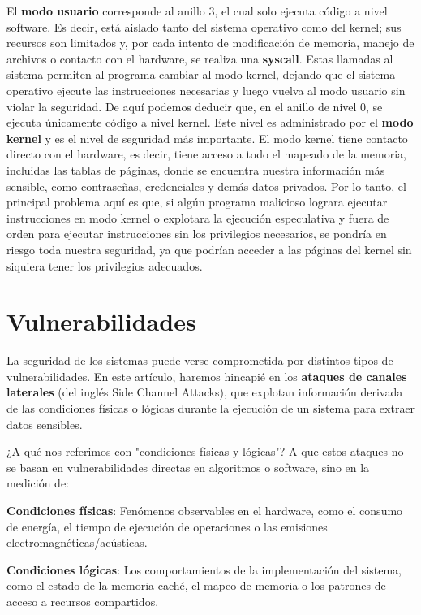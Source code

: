 \documentclass[lettersize,compsoc]{IEEEtran}
\begin{document}
El \textbf{modo usuario} corresponde al anillo 3, el cual solo ejecuta código a nivel software. Es decir, está aislado tanto del sistema operativo como del kernel; sus recursos son limitados y, por cada intento de modificación de memoria, manejo de archivos o contacto con el hardware, se realiza una \textbf{syscall}\cite{syscall}. Estas llamadas al sistema permiten al programa cambiar al modo kernel, dejando que el sistema operativo ejecute las instrucciones necesarias y luego vuelva al modo usuario sin violar la seguridad.
\newline
De aquí podemos deducir que, en el anillo de nivel 0, se ejecuta únicamente código a nivel kernel. Este nivel es administrado por el \textbf{modo kernel} y es el nivel de seguridad más importante. El modo kernel tiene contacto directo con el hardware, es decir, tiene acceso a todo el mapeado de la memoria, incluidas las tablas de páginas, donde se encuentra nuestra información más sensible, como contraseñas, credenciales y demás datos privados.
\newline
Por lo tanto, el principal problema aquí es que, si algún programa malicioso lograra ejecutar instrucciones en modo kernel o explotara la ejecución especulativa y fuera de orden para ejecutar instrucciones sin los privilegios necesarios, se pondría en riesgo toda nuestra seguridad, ya que podrían acceder a las páginas del kernel sin siquiera tener los privilegios adecuados.

\section{Vulnerabilidades}

La seguridad de los sistemas puede verse comprometida por distintos tipos de vulnerabilidades. En este artículo, haremos hincapié en los \textbf{ataques de canales laterales} \cite{Side Channel Attack} (del inglés Side Channel Attacks), que explotan información derivada de las condiciones físicas o lógicas durante la ejecución de un sistema para extraer datos sensibles.

¿A qué nos referimos con "condiciones físicas y lógicas"? A que estos ataques no se basan en vulnerabilidades directas en algoritmos o software, sino en la medición de:

    \textbf{Condiciones físicas}: Fenómenos observables en el hardware, como el consumo de energía, el tiempo de ejecución de operaciones o las emisiones electromagnéticas/acústicas.

    \textbf{Condiciones lógicas}: Los comportamientos de la implementación del sistema, como el estado de la memoria caché, el mapeo de memoria o los patrones de acceso a recursos compartidos.
\end{document}
